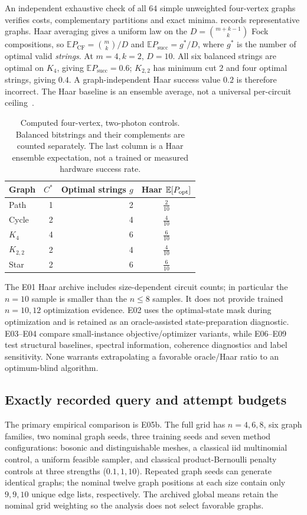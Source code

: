 \documentclass[11pt,a4paper]{article}
\theoremstyle{remark}\newtheorem{remark}[theorem]{Remark}
\newcommand{\E}{\mathbb E}
\newcommand{\CF}{\mathrm{CF}}
\newcommand{\succp}{P_{\mathrm{succ}}}
\begin{document}
An independent exhaustive check of all $64$ simple unweighted four-vertex graphs verifies costs, complementary partitions and exact minima.  records representative graphs. Haar averaging gives a uniform law on the $D=\binom{m+k-1}{k}$ Fock compositions, so $\E P_{\CF}=\binom{m}{k}/D$ and $\E\succp=g^*/D$, where $g^*$ is the number of optimal valid \emph{strings}. At $m=4,k=2$, $D=10$. All six balanced strings are optimal on $K_4$, giving $\E\succp=0.6$; $K_{2,2}$ has minimum cut $2$ and four optimal strings, giving $0.4$. A graph-independent Haar success value $0.2$ is therefore incorrect. The Haar baseline is an ensemble average, not a universal per-circuit ceiling~\cite{arkhipov2012}.
\begin{table}[t]
\centering
\begin{tabular}{lrrc}
\hline
Graph & $C^*$ & Optimal strings $g$ & Haar $\mathbb{E}[P_{\rm opt}]$ \\
\hline
Path & 1 & 2 & $\frac{2}{10}$ \\
Cycle & 2 & 4 & $\frac{4}{10}$ \\
$K_4$ & 4 & 6 & $\frac{6}{10}$ \\
$K_{2,2}$ & 2 & 4 & $\frac{4}{10}$ \\
Star & 2 & 6 & $\frac{6}{10}$ \\
\hline
\end{tabular}
\caption{Computed four-vertex, two-photon controls. Balanced bitstrings and their complements are counted separately. The last column is a Haar ensemble expectation, not a trained or measured hardware success rate.}
\label{tab:graphs}
\end{table}


The E01 Haar archive includes size-dependent circuit counts; in particular the $n=10$ sample is smaller than the $n\le8$ samples. It does not provide trained $n=10,12$ optimization evidence. E02 uses the optimal-state mask during optimization and is retained as an oracle-assisted state-preparation diagnostic. E03--E04 compare small-instance objective/optimizer variants, while E06--E09 test structural baselines, spectral information, coherence diagnostics and label sensitivity. None warrants extrapolating a favorable oracle/Haar ratio to an optimum-blind algorithm.

\subsection{Exactly recorded query and attempt budgets}
The primary empirical comparison is E05b. The full grid has $n=4,6,8$, six graph families, two nominal graph seeds, three training seeds and seven method configurations: bosonic and distinguishable meshes, a classical iid multinomial control, a uniform feasible sampler, and classical product-Bernoulli penalty controls at three strengths ($0.1,1,10$). Repeated graph seeds can generate identical graphs; the nominal twelve graph positions at each size contain only $9,9,10$ unique edge lists, respectively. The archived global means retain the nominal grid weighting so the analysis does not select favorable graphs.
\end{document}
